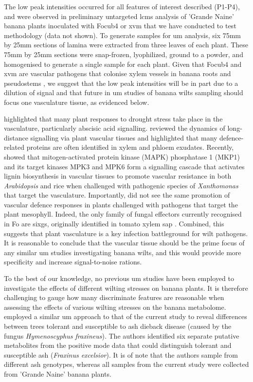 The low peak intensities occurred for all features of interest described (P1-P4), and were observed in preliminary untargeted \ac{lcms} analysis of 'Grande Naine' banana plants inoculated with \ac{Focub4} or \ac{xvm} that we have conducted to test methodology (data not shown). To generate samples for \ac{um} analysis, six 75mm by 25mm sections of lamina were extracted from three leaves of each plant. These 75mm by 25mm sections were snap-frozen, lyophilized, ground to a powder, and homogenised to generate a single sample for each plant. Given that \ac{Focub4} and \ac{xvm} are vascular pathogens that colonise xylem vessels in banana roots and pseudostems \parencite{Li2011, Pegg2019}, we suggest that the low peak intensities will be in part due to a dilution of signal and that future in \ac{um} studies of banana wilts sampling should focus one vasculature tissue, as evidenced below. 

\textcite{Takahashi2020} highlighted that many plant responses to drought stress take place in the vasculature, particularly abscisic acid signalling. \textcite{Notaguchi2015} reviewed the dynamics of long-distance signalling via plant vascular tissues and highlighted that many defence-related proteins are often identified in xylem and phloem exudates. Recently, \textcite{Lin2022} showed that mitogen-activated protein kinase (MAPK) phosphatase 1 (MKP1) and its target kinases MPK3 and MPK6 form a signalling cascade that activates lignin biosynthesis in vascular tissues to promote vascular resistance in both \textit{Arabidopsis} and rice when challenged with pathogenic species of \textit{Xanthomonas} that target the vasculature. Importantly, \textcite{Lin2022} did not see the same promotion of vascular defence responses in plants challenged with pathogens that target the plant mesophyll. Indeed, the only family of fungal effectors currently recognised in \ac{Fo} are \acfp{sixg}, originally identified in tomato xylem sap \parencite{Houterman2007}. Combined, this suggests that plant vasculature is a key infection battleground for wilt pathogens. It is reasonable to conclude that the vascular tissue should be the prime focus of any similar \ac{um} studies investigating banana wilts, and this would provide more specificity and increase signal-to-noise rations. 

\bigskip
\noindent
To the best of our knowledge, no previous \ac{um} studies have been employed to investigate the effects of different wilting stresses on banana plants. It is therefore challenging to gauge how many discriminate features are reasonable when assessing the effects of various wilting stresses on the banana metabolome. \textcite{Sambles2017} employed a similar \ac{um} approach to that of the current study to reveal differences between trees tolerant and susceptible to ash dieback disease (caused by the fungus \textit{Hymenoscyphus fraxineus}). The authors identified six separate putative metabolites from the positive mode data that could distinguish tolerant and susceptible ash (\textit{Fraxinus excelsior}). It is of note that the authors sample from different ash genotypes, whereas all samples from the current study were collected from 'Grande Naine' banana plants. 

